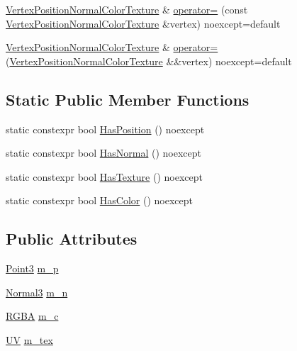 \begin{DoxyCompactItemize}
\mbox{\hyperlink{structmage_1_1rendering_1_1_vertex_position_normal_color_texture}{Vertex\+Position\+Normal\+Color\+Texture}} \& \mbox{\hyperlink{structmage_1_1rendering_1_1_vertex_position_normal_color_texture_a1294256508192d8a1682005225d9d8bb}{operator=}} (const \mbox{\hyperlink{structmage_1_1rendering_1_1_vertex_position_normal_color_texture}{Vertex\+Position\+Normal\+Color\+Texture}} \&vertex) noexcept=default
\item 
\mbox{\hyperlink{structmage_1_1rendering_1_1_vertex_position_normal_color_texture}{Vertex\+Position\+Normal\+Color\+Texture}} \& \mbox{\hyperlink{structmage_1_1rendering_1_1_vertex_position_normal_color_texture_a0f58dc339305a1cc48845824b688b749}{operator=}} (\mbox{\hyperlink{structmage_1_1rendering_1_1_vertex_position_normal_color_texture}{Vertex\+Position\+Normal\+Color\+Texture}} \&\&vertex) noexcept=default
\end{DoxyCompactItemize}
\subsection*{Static Public Member Functions}
\begin{DoxyCompactItemize}
\item 
static constexpr bool \mbox{\hyperlink{structmage_1_1rendering_1_1_vertex_position_normal_color_texture_a137dda2aa8e30d88c87b53cd4d2d2842}{Has\+Position}} () noexcept
\item 
static constexpr bool \mbox{\hyperlink{structmage_1_1rendering_1_1_vertex_position_normal_color_texture_aa8f1585c1dba229b765d5697a37cb0e6}{Has\+Normal}} () noexcept
\item 
static constexpr bool \mbox{\hyperlink{structmage_1_1rendering_1_1_vertex_position_normal_color_texture_a8b5e0a50a6119868ebf90247d321f172}{Has\+Texture}} () noexcept
\item 
static constexpr bool \mbox{\hyperlink{structmage_1_1rendering_1_1_vertex_position_normal_color_texture_a1688dd4509c6766bea6fc15a4bcb348d}{Has\+Color}} () noexcept
\end{DoxyCompactItemize}
\subsection*{Public Attributes}
\begin{DoxyCompactItemize}
\item 
\mbox{\hyperlink{structmage_1_1_point3}{Point3}} \mbox{\hyperlink{structmage_1_1rendering_1_1_vertex_position_normal_color_texture_a7eb2e2d7970bd3794d9b6f9f3b1db3e7}{m\+\_\+p}}
\item 
\mbox{\hyperlink{structmage_1_1_normal3}{Normal3}} \mbox{\hyperlink{structmage_1_1rendering_1_1_vertex_position_normal_color_texture_aa42ee4c320dec19edeef4a7018d68329}{m\+\_\+n}}
\item 
\mbox{\hyperlink{structmage_1_1_r_g_b_a}{R\+G\+BA}} \mbox{\hyperlink{structmage_1_1rendering_1_1_vertex_position_normal_color_texture_a0fe59b253cf0a9118fbc67ea5a18df81}{m\+\_\+c}}
\item 
\mbox{\hyperlink{structmage_1_1_u_v}{UV}} \mbox{\hyperlink{structmage_1_1rendering_1_1_vertex_position_normal_color_texture_a3c964b9b06e3bcc59b33fc1a273c13a7}{m\+\_\+tex}}
\end{DoxyCompactItemize}
